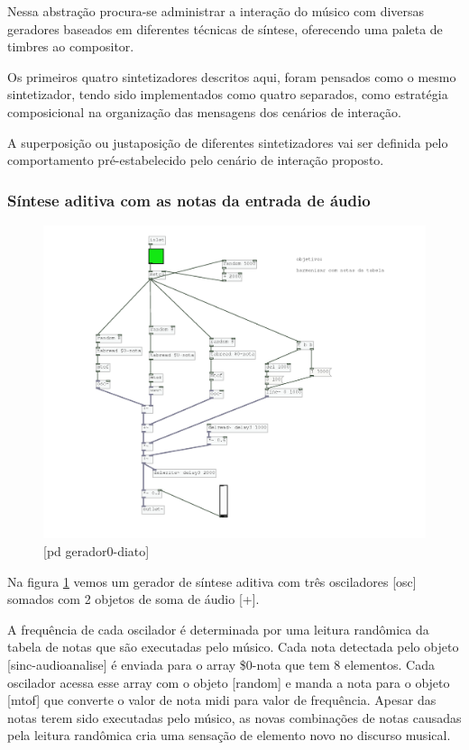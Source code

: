 \documentclass{ppgmus}
\begin{document}
Nessa abstração procura-se administrar a interação do músico
com diversas geradores baseados em diferentes técnicas de síntese,
oferecendo uma paleta de timbres ao compositor.

Os primeiros quatro sintetizadores descritos aqui, foram pensados como o mesmo
sintetizador, tendo sido implementados como quatro separados, como estratégia
composicional na organização das mensagens dos cenários de interação.




A superposição ou justaposição de diferentes sintetizadores vai
ser definida pelo comportamento pré-estabelecido pelo cenário de interação
proposto.





\subsubsection{Síntese aditiva com as notas da entrada de áudio}



\begin{figure}
\includegraphics[scale=.6]{gerador-sintese0-diato}
\caption{[pd gerador0-diato]}
\label{gerador0diato}
\end{figure}

Na figura \ref{gerador0diato} vemos um gerador de síntese
aditiva com três osciladores [osc\texttildelow] somados com
2 objetos de soma de áudio [+\texttildelow].

A frequência de cada oscilador é determinada por uma leitura randômica da
tabela de notas que são executadas pelo músico. Cada nota detectada pelo
objeto [sinc-audioanalise] é enviada para o array \$0-nota que tem 8 elementos.
Cada oscilador acessa esse array com o objeto [random] e manda a nota para o
objeto [mtof] que converte o valor de nota midi para valor de frequência.
Apesar das notas terem sido executadas pelo músico, as novas combinações 
de notas causadas pela leitura randômica cria uma sensação de elemento novo
no discurso musical.
\end{document}
